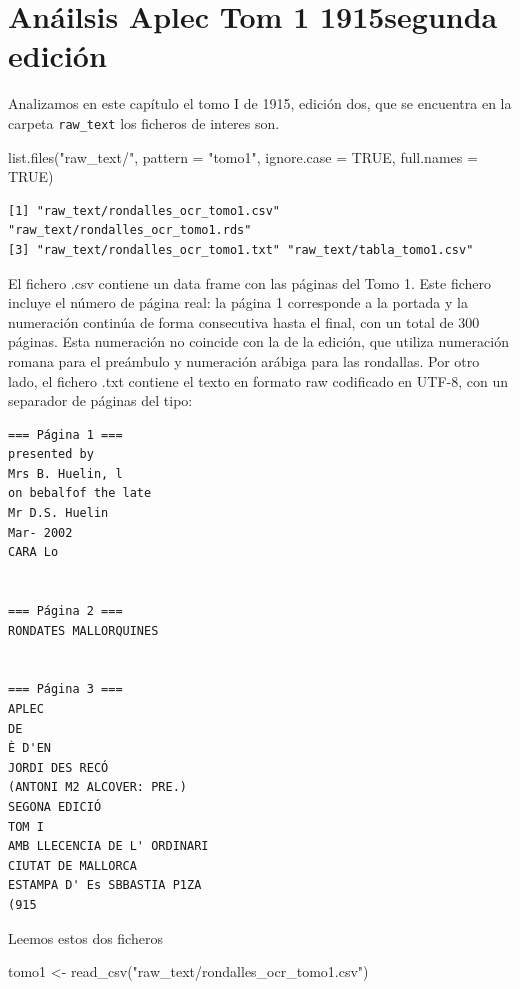 \documentclass[
  letterpaper,
  DIV=11,
  numbers=noendperiod]{scrreprt}
\newenvironment{Shaded}{\begin{snugshade}}{\end{snugshade}}
\newcommand{\AttributeTok}[1]{\textcolor[rgb]{0.40,0.45,0.13}{#1}}
\newcommand{\ConstantTok}[1]{\textcolor[rgb]{0.56,0.35,0.01}{#1}}
\newcommand{\FunctionTok}[1]{\textcolor[rgb]{0.28,0.35,0.67}{#1}}
\newcommand{\NormalTok}[1]{\textcolor[rgb]{0.00,0.23,0.31}{#1}}
\newcommand{\OtherTok}[1]{\textcolor[rgb]{0.00,0.23,0.31}{#1}}
\newcommand{\StringTok}[1]{\textcolor[rgb]{0.13,0.47,0.30}{#1}}
\begin{document}
\chapter{Anáilsis Aplec Tom 1 1915segunda
edición}\label{anuxe1ilsis-aplec-tom-1-1915segunda-ediciuxf3n}

Analizamos en este capítulo el tomo I de 1915, edición dos, que se
encuentra en la carpeta \texttt{raw\_text} los ficheros de interes son.

\begin{Shaded}
\begin{Highlighting}[]
\FunctionTok{list.files}\NormalTok{(}\StringTok{"raw\_text/"}\NormalTok{, }\AttributeTok{pattern =} \StringTok{"tomo1"}\NormalTok{, }\AttributeTok{ignore.case =} \ConstantTok{TRUE}\NormalTok{, }\AttributeTok{full.names =} \ConstantTok{TRUE}\NormalTok{)}
\end{Highlighting}
\end{Shaded}

\begin{verbatim}
[1] "raw_text/rondalles_ocr_tomo1.csv" "raw_text/rondalles_ocr_tomo1.rds"
[3] "raw_text/rondalles_ocr_tomo1.txt" "raw_text/tabla_tomo1.csv"        
\end{verbatim}

El fichero .csv contiene un data frame con las páginas del Tomo 1. Este
fichero incluye el número de página real: la página 1 corresponde a la
portada y la numeración continúa de forma consecutiva hasta el final,
con un total de 300 páginas. Esta numeración no coincide con la de la
edición, que utiliza numeración romana para el preámbulo y numeración
arábiga para las rondallas. Por otro lado, el fichero .txt contiene el
texto en formato raw codificado en UTF-8, con un separador de páginas
del tipo:

\begin{verbatim}
=== Página 1 ===
presented by
Mrs B. Huelin, l
on bebalfof the late
Mr D.S. Huelin
Mar- 2002
CARA Lo


=== Página 2 ===
RONDATES MALLORQUINES


=== Página 3 ===
APLEC
DE
È D'EN
JORDI DES RECÓ
(ANTONI M2 ALCOVER: PRE.)
SEGONA EDICIÓ
TOM I
AMB LLECENCIA DE L' ORDINARI
CIUTAT DE MALLORCA
ESTAMPA D' Es SBBASTIA P1ZA
(915

\end{verbatim}

Leemos estos dos ficheros

\begin{Shaded}
\begin{Highlighting}[]
\NormalTok{tomo1 }\OtherTok{\textless{}{-}} \FunctionTok{read\_csv}\NormalTok{(}\StringTok{"raw\_text/rondalles\_ocr\_tomo1.csv"}\NormalTok{)}
\end{Highlighting}
\end{Shaded}
\end{document}
